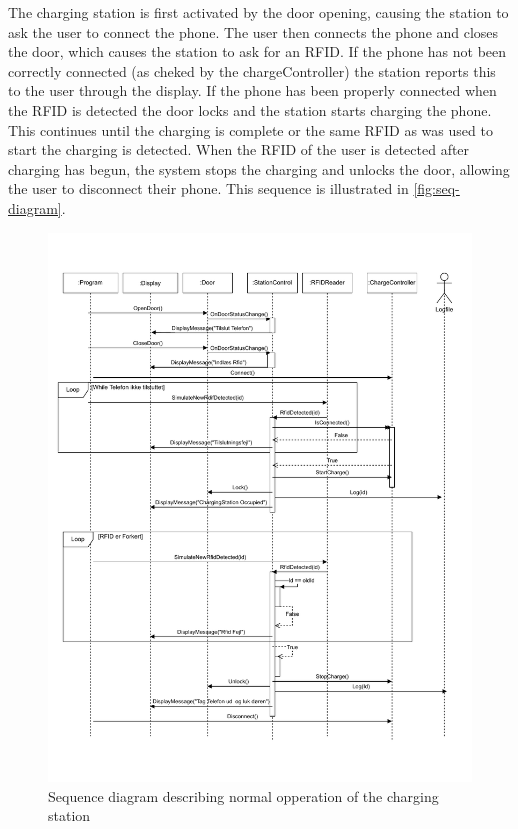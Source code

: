 The charging station is first activated by the door opening, causing the station to ask the user to connect the phone. The user then connects the phone and closes the door, which causes the station to ask for an RFID. If the phone has not been correctly connected (as cheked by the chargeController) the station reports this to the user through the display. If the phone has been properly connected when the RFID is detected the door locks and the station starts charging the phone. This continues until the charging is complete or the same RFID as was used to start the charging is detected. When the RFID of the user is detected after charging has begun, the system stops the charging and unlocks the door, allowing the user to disconnect their phone.
This sequence is illustrated in \autoref{fig:seq-diagram}.

\newpage

\begin{figure}[h]
  \centering
  \includegraphics[scale = .6, trim={0cm 2cm 0cm 0cm}]{02-Body/images/SEQpdf.pdf}
  \caption{Sequence diagram describing normal opperation of the charging station}
  \label{fig:seq-diagram}
\end{figure}

\newpage
